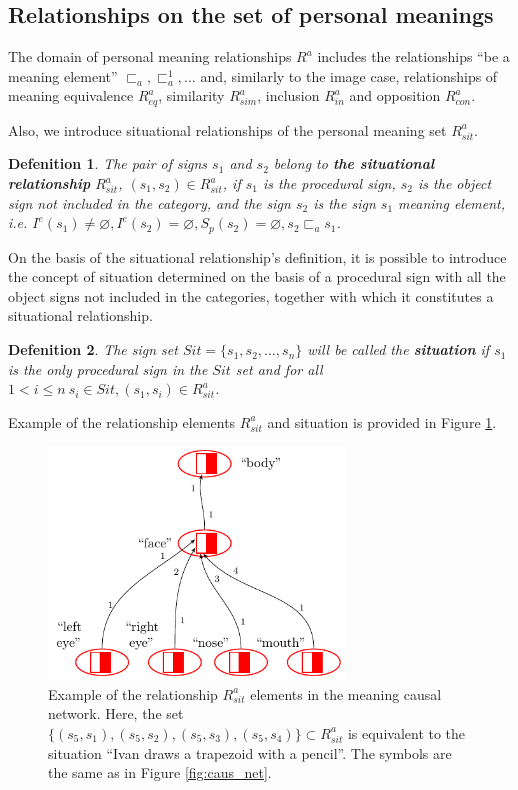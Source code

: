 \documentclass[review]{elsarticle}
\newtheorem{definition}{Defenition}
\begin{document}
\subsection{Relationships on the set of personal meanings}	
The domain of personal meaning relationships $R^a$ includes the relationships ``be a meaning element'' ${\sqsubset_a,\sqsubset_a^1,\dots}$ and, similarly to the image case, relationships of meaning equivalence $R_{eq}^a$, similarity $R_{sim}^a$, inclusion $R_{in}^a$ and opposition $R_{con}^a$.

Also, we introduce situational relationships of the personal meaning set $R_{sit}^a$.

\begin{definition}
	The pair of signs $s_1$ and $s_2$ belong to \textbf{the situational relationship} $R_{sit}^a$, $(s_1,s_2)\in R_{sit}^a$, if $s_1$ is the procedural sign, $s_2$ is the object sign not included in the category, and the sign $s_2$ is the sign $s_1$ meaning element, i.e. $I^e(s_1)\not = \varnothing, I^e(s_2) = \varnothing, S_p(s_2)=\varnothing, s_2\sqsubset_a s_1$.
\end{definition}

On the basis of the situational relationship's definition, it is possible to introduce the concept of situation determined on the basis of a procedural sign with all the object signs not included in the categories, together with which it constitutes a situational relationship.

\begin{definition}
	The sign set $Sit=\{s_1,s_2,\dots,s_n\}$ will be called the \textbf{situation} if $s_1$ is the only procedural sign in the $Sit$ set and for all $1<i\leq n\ s_i\in Sit, (s_1,s_i)\in R_{sit}^a$.
\end{definition}

Example of the relationship elements $R_{sit}^a$ and situation is provided in Figure \ref{fig:mean_relat}.

\begin{figure}[h]
	\centering
	\includegraphics[width=0.7\textwidth,page=3]{examples/causnet/en/caus_net_colored_en}
	\caption{Example of the relationship $R_{sit}^a$ elements in the meaning causal network. Here, the set $\{(s_5,s_1),(s_5,s_2),(s_5,s_3),(s_5,s_4)\}\subset R_{sit}^a$ is equivalent to the situation ``Ivan draws a trapezoid with a pencil''. The symbols are the same as in Figure \ref{fig:caus_net}.}
	\label{fig:mean_relat}		
\end{figure}
\end{document}
